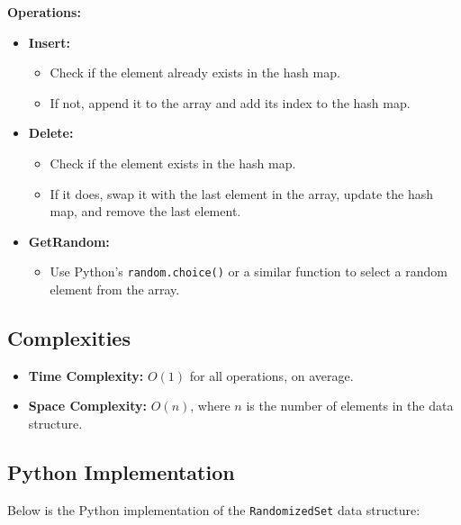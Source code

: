 \textbf{Operations:}
\begin{itemize}
    \item \textbf{Insert:}
    \begin{itemize}
        \item Check if the element already exists in the hash map.
        \item If not, append it to the array and add its index to the hash map.
    \end{itemize}
    \item \textbf{Delete:}
    \begin{itemize}
        \item Check if the element exists in the hash map.
        \item If it does, swap it with the last element in the array, update the hash map, and remove the last element.
    \end{itemize}
    \item \textbf{GetRandom:}
    \begin{itemize}
        \item Use Python’s \texttt{random.choice()} or a similar function to select a random element from the array.
    \end{itemize}
\end{itemize}

\subsection*{Complexities}
\begin{itemize}
    \item \textbf{Time Complexity:} \(O(1)\) for all operations, on average.
    \item \textbf{Space Complexity:} \(O(n)\), where \(n\) is the number of elements in the data structure.
\end{itemize}

\subsection*{Python Implementation}
Below is the Python implementation of the \texttt{RandomizedSet} data structure:

